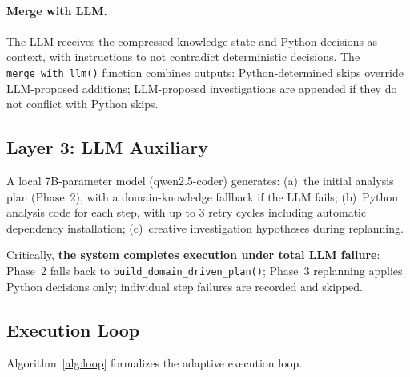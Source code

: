 \documentclass[11pt,a4paper]{article}
\begin{document}
\paragraph{Merge with LLM.}
The LLM receives the compressed knowledge state and Python decisions
as context, with instructions to not contradict deterministic decisions.
The \texttt{merge\_with\_llm()} function combines outputs:
Python-determined skips override LLM-proposed additions;
LLM-proposed investigations are appended if they do not conflict
with Python skips.

\subsection{Layer 3: LLM Auxiliary}

A local 7B-parameter model (qwen2.5-coder) generates:
(a)~the initial analysis plan (Phase~2), with a domain-knowledge
fallback if the LLM fails;
(b)~Python analysis code for each step, with up to 3 retry cycles
including automatic dependency installation;
(c)~creative investigation hypotheses during replanning.

Critically, \textbf{the system completes execution under total LLM
failure}: Phase~2 falls back to \texttt{build\_domain\_driven\_plan()};
Phase~3 replanning applies Python decisions only; individual step
failures are recorded and skipped.

\subsection{Execution Loop}

Algorithm~\ref{alg:loop} formalizes the adaptive execution loop.
\end{document}
